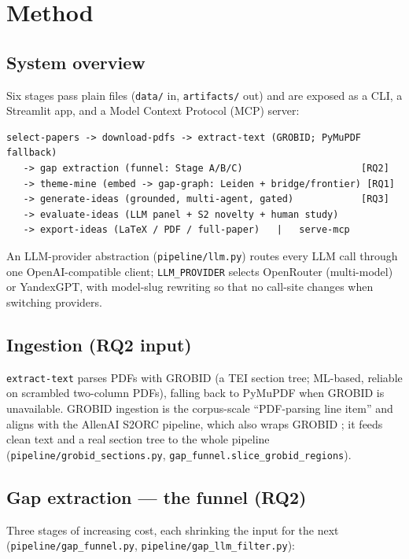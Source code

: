 \section{Method}
\label{sec:method}

\subsection{System overview}
Six stages pass plain files (\texttt{data/} in, \texttt{artifacts/} out) and are
exposed as a CLI, a Streamlit app, and a Model Context Protocol (MCP) server:

\begin{lstlisting}
select-papers -> download-pdfs -> extract-text (GROBID; PyMuPDF fallback)
   -> gap extraction (funnel: Stage A/B/C)                     [RQ2]
   -> theme-mine (embed -> gap-graph: Leiden + bridge/frontier) [RQ1]
   -> generate-ideas (grounded, multi-agent, gated)            [RQ3]
   -> evaluate-ideas (LLM panel + S2 novelty + human study)
   -> export-ideas (LaTeX / PDF / full-paper)   |   serve-mcp
\end{lstlisting}

An LLM-provider abstraction (\texttt{pipeline/llm.py}) routes every LLM call
through one OpenAI-compatible client; \texttt{LLM\_PROVIDER} selects OpenRouter
(multi-model) or YandexGPT, with model-slug rewriting so that no call-site changes
when switching providers.

\subsection{Ingestion (RQ2 input)}
\texttt{extract-text} parses PDFs with GROBID \citep{grobid} (a TEI section tree;
ML-based, reliable on scrambled two-column PDFs), falling back to PyMuPDF when
GROBID is unavailable. GROBID ingestion is the corpus-scale ``PDF-parsing line
item'' and aligns with the AllenAI S2ORC pipeline, which also wraps GROBID
\citep{s2orc}; it feeds clean text and a real section tree to the whole pipeline
(\texttt{pipeline/grobid\_sections.py}, \texttt{gap\_funnel.slice\_grobid\_regions}).

\subsection{Gap extraction --- the funnel (RQ2)}
\label{sec:method-funnel}
Three stages of increasing cost, each shrinking the input for the next
(\texttt{pipeline/gap\_funnel.py}, \texttt{pipeline/gap\_llm\_filter.py}):

